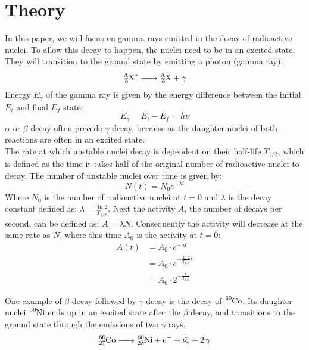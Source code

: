 \documentclass[a4paper, 11pt, table]{article}
\begin{document}
\section{Theory}
In this paper, we will focus on gamma rays emitted in the decay of radioactive nuclei. To allow this decay to happen, the nuclei need to be in an excited state. They will transition to the ground state by emitting a photon (gamma ray):
\begin{equation}
    \ce{^A_ZX^* -> ^A_ZX + \gamma}
\end{equation}
Energy $E_\gamma$ of the gamma ray is given by the energy difference between the initial $E_i$ and final $E_f$ state:
\begin{equation} \label{eq:energy_gammaray}
    E_\gamma = E_i -E_f = h\nu
\end{equation}
$\alpha$ or $\beta$ decay often precede $\gamma$ decay, because as the daughter nuclei of both reactions are often in an excited state. \cite{cottingham_2004_an}\\

The rate at which unstable nuclei decay is dependent on their half-life $T_{1/2}$, which is defined as the time it takes half of the original number of radioactive nuclei to decay. The number of unstable nuclei over time is given by:
\begin{equation}
    N(t) = N_0 e^{-\lambda t}
\end{equation}
Where $N_0$ is the number of radioactive nuclei at $t=0$ and $\lambda$ is the decay constant defined as: $\lambda = \frac{\ln{2}}{T_{1/2}}$. Next the activity $A$, the number of decays per second, can be defined as: $A = \lambda N$. \cite{cottingham_2004_an} Consequently the activity will decrease at the same rate as $N$, where this time $A_0$ is the activity at $t=0$:
\begin{align} \label{eq:activity}
    A(t) & = A_0 \cdot e^{-\lambda t} \nonumber                \\
         & = A_0 \cdot e^{-\frac{\ln{2}}{T_{1/2}} t} \nonumber \\
         & = A_0 \cdot 2^{-\frac{t}{T_{1/2}}}
\end{align}

One example of $\beta$ decay followed by $\gamma$ decay is the decay of $\ce{^{60}Co}$. Its daughter nuclei $\ce{^{60}Ni}$ ends up in an excited state after the $\beta$ decay, and transitions to the ground state through the emissions of two $\gamma$ rays.
\begin{equation} \label{eq:Co_decay}
    \ce{^{60}_{27}Co -> ^{60}_{28}Ni + e^- + \Bar{\nu_e} + 2\gamma}
\end{equation}
\end{document}
